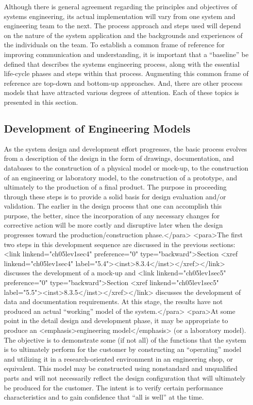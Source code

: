 Although there is general agreement regarding the principles and objectives of systems engineering, its actual implementation will vary from one system and engineering team to the next. The process approach and steps used will depend on the nature of the system application and the backgrounds and experiences of the individuals on the team. To establish a common frame of reference for improving communication and understanding, it is important that a “baseline” be defined that describes the systems engineering process, along with the essential life-cycle phases and steps within that process. Augmenting this common frame of reference are top-down and bottom-up approaches. And, there are other process models that have attracted various degrees of attention. Each of these topics is presented in this section.

\subsection{Development of Engineering Models}

As the system design and development effort progresses, the basic process evolves from a description of the design in the form of drawings, documentation, and databases to the construction of a physical model or mock-up, to the construction of an engineering or laboratory model, to the construction of a prototype, and ultimately to the production of a final product. The purpose in proceeding through these steps is to provide a solid basis for design evaluation and/or validation. The earlier in the design process that one can accomplish this purpose, the better, since the incorporation of any necessary changes for corrective action will be more costly and disruptive later when the design progresses toward the production/construction phase.</para>
<para>The first two steps in this development sequence are discussed in the previous sections: <link linkend="ch05lev1sec4" preference="0" type="backward">Section <xref linkend="ch05lev1sec4" label="5.4"><inst>8.3.4</inst></xref></link> discusses the development of a mock-up and <link linkend="ch05lev1sec5" preference="0" type="backward">Section <xref linkend="ch05lev1sec5" label="5.5"><inst>8.3.5</inst></xref></link> discusses the development of data and documentation requirements. At this stage, the results have not produced an actual “working” model of the system.</para>
<para>At some point in the detail design and development phase, it may be appropriate to produce an <emphasis>engineering model</emphasis> (or a laboratory model). The objective is to demonstrate some (if not all) of the functions that the system is to ultimately perform for the customer by constructing an “operating” model and utilizing it in a research-oriented environment in an engineering shop, or equivalent. This model may be constructed using nonstandard and unqualified parts and will not necessarily reflect the design configuration that will ultimately be produced for the customer. The intent is to verify certain performance characteristics and to gain confidence that “all is well” at the time.

